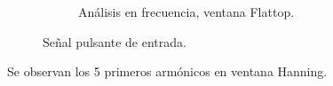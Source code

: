 \begin{figure}[H]
\begin{subfigure}[H]{0.48\textwidth}
        \end{subfigure}
        \begin{subfigure}[H]{0.48\textwidth}
          \caption{Análisis en frecuencia, ventana Flattop.}
        \end{subfigure}

        \caption{Señal pulsante de entrada.}
        \label{fig:Exp2SeñalPulsanteVentanasEspectro}
      \end{figure}

      Se observan los 5 primeros armónicos en ventana Hanning.

